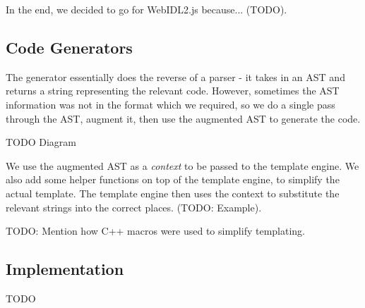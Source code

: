 In the end, we decided to go for WebIDL2.js because... (TODO).


\subsection{Code Generators} %
\label{sub:code_generators_design}
The generator essentially does the reverse of a parser - it takes in an AST and returns a string representing the relevant code. However, sometimes the AST information was not in the format which we required, so we do a single pass through the AST, augment it, then use the augmented AST to generate the code. 


TODO Diagram


We use the augmented AST as a \emph{context} to be passed to the template engine. We also add some helper functions on top of the template engine, to simplify the actual template. The template engine then uses the context to substitute the relevant strings into the correct places. (TODO: Example).


TODO: Mention how C++ macros were used to simplify templating.


\subsection{Implementation} %
\label{sub:implementation_codegen}
TODO



